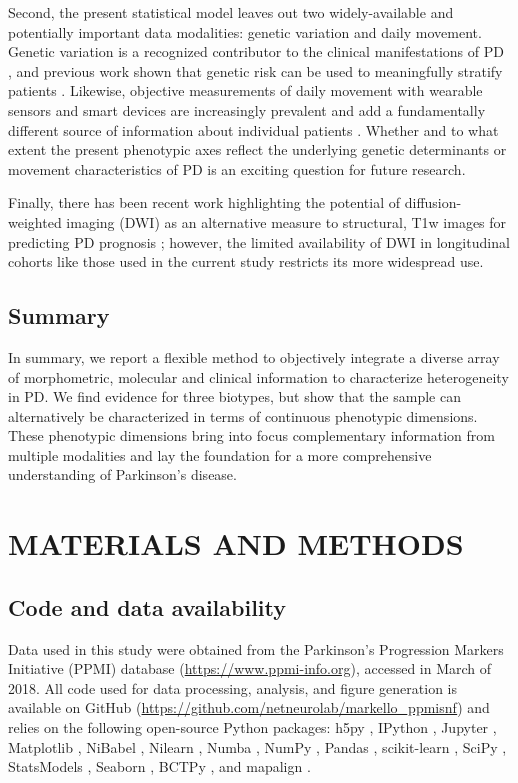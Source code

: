 \documentclass[12pt,aps,pra,reprint,showkeys]{revtex4-1}
\begin{document}
Second, the present statistical model leaves out two widely-available and potentially important data modalities: genetic variation and daily movement.
Genetic variation is a recognized contributor to the clinical manifestations of PD \citep{nalls2014large}, and previous work shown that genetic risk can be used to meaningfully stratify patients \citep{sandor2019biorxiv}. 
Likewise, objective measurements of daily movement with wearable sensors and smart devices are increasingly prevalent and add a fundamentally different source of information about individual patients \citep{maetzler2013movementdisord}.
Whether and to what extent the present phenotypic axes reflect the underlying genetic determinants or movement characteristics of PD is an exciting question for future research.

Finally, there has been recent work highlighting the potential of diffusion-weighted imaging (DWI) as an alternative measure to structural, T1w images for predicting PD prognosis \citep{abbasi2019predicting}; however, the limited availability of DWI in longitudinal cohorts like those used in the current study restricts its more widespread use.

\subsection*{Summary}

In summary, we report a flexible method to objectively integrate a diverse array of morphometric, molecular and clinical information to characterize heterogeneity in PD.
We find evidence for three biotypes, but show that the sample can alternatively be characterized in terms of continuous phenotypic dimensions.
These phenotypic dimensions bring into focus complementary information from multiple modalities and lay the foundation for a more comprehensive understanding of Parkinson's disease.

\section*{MATERIALS AND METHODS}

\subsection*{Code and data availability}

Data used in this study were obtained from the Parkinson's Progression Markers Initiative (PPMI) database (\url{https://www.ppmi-info.org}), accessed in March of 2018.
All code used for data processing, analysis, and figure generation is available on GitHub (\url{https://github.com/netneurolab/markello_ppmisnf}) and relies on the following open-source Python packages: h5py \citep{h5py}, IPython \citep{ipython}, Jupyter \citep{jupyter}, Matplotlib \citep{matplotlib}, NiBabel \citep{nibabel}, Nilearn \citep{nilearn}, Numba \citep{numba}, NumPy \citep{numpyv1, numpyv2}, Pandas \citep{pandas}, scikit-learn \citep{sklearn}, SciPy \citep{scipy}, StatsModels \citep{statsmodels}, Seaborn \citep{seaborn}, BCTPy \citep{rubinov2010complex}, and mapalign \citep{langs2015predicting}.
\end{document}
